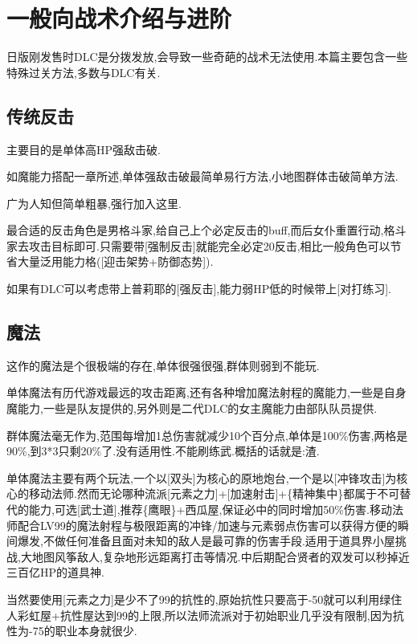 
\newpage

\section{一般向战术介绍与进阶}

日版刚发售时DLC是分拨发放,会导致一些奇葩的战术无法使用.本篇主要包含一些特殊过关方法,多数与DLC有关.

	\subsection{传统反击}

	主要目的是单体高HP强敌击破.

	如魔能力搭配一章所述,单体强敌击破最简单易行方法,小地图群体击破简单方法.

	广为人知但简单粗暴,强行加入这里.

	最合适的反击角色是男格斗家,给自己上个必定反击的buff,而后女仆重置行动,格斗家去攻击目标即可.只需要带[强制反击]就能完全必定20反击,相比一般角色可以节省大量泛用能力格([迎击架势+防御态势]).

	如果有DLC可以考虑带上普莉耶的[强反击],能力弱HP低的时候带上[对打练习].

	\subsection{魔法}

	这作的魔法是个很极端的存在,单体很强很强,群体则弱到不能玩.

	单体魔法有历代游戏最远的攻击距离,还有各种增加魔法射程的魔能力,一些是自身魔能力,一些是队友提供的,另外则是二代DLC的女主魔能力由部队队员提供.

	群体魔法毫无作为,范围每增加1总伤害就减少10个百分点,单体是100\%伤害,两格是90\%,到3*3只剩20\%了.没有适用性.不能刷练武.概括的话就是:渣.

	单体魔法主要有两个玩法,一个以[双头]为核心的原地炮台,一个是以[冲锋攻击]为核心的移动法师.然而无论哪种流派[元素之力]+[加速射击]+\{精神集中\}都属于不可替代的能力,可选[武士道],推荐\{鹰眼\}+西瓜屋,保证必中的同时增加50\%伤害.移动法师配合LV99的魔法射程与极限距离的冲锋/加速与元素弱点伤害可以获得方便的瞬间爆发,不做任何准备且面对未知的敌人是最可靠的伤害手段.适用于道具界小屋挑战,大地图风筝敌人,复杂地形远距离打击等情况.中后期配合贤者的双发可以秒掉近三百亿HP的道具神.

	当然要使用[元素之力]是少不了99的抗性的,原始抗性只要高于-50就可以利用绿住人彩虹屋+抗性屋达到99的上限,所以法师流派对于初始职业几乎没有限制,因为抗性为-75的职业本身就很少.

